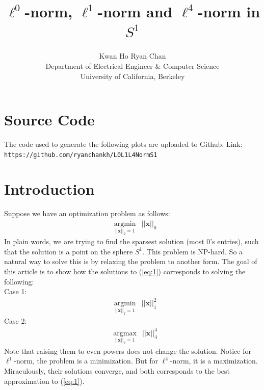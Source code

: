 \documentclass[11pt]{article}
\begin{document}
\title{$\ell^0$-norm, $\ell^1$-norm and $\ell^4$-norm in $S^1$}
\author{Kwan Ho Ryan Chan\\Department of Electrical Engineer \& Computer Science\\University of California, Berkeley}
\maketitle

\section{Source Code}
	The code used to generate the following plots are uploaded to Github. Link: \texttt{https://github.com/ryanchankh/L0L1L4NormS1}
\section{Introduction}
Suppose we have an optimization problem as follows:
\begin{equation}
\begin{aligned}
     & \underset{||\bm{x}||_2=1}{\text{argmin}} & ||\bm{x}||_0  \label{eq:1}
\end{aligned}
\end{equation}
In plain words, we are trying to find the sparsest solution (most 0's entries), such that the solution
is a point on the sphere $S^1$. This problem is NP-hard. So a natural way to solve this is by relaxing the problem to another form. The goal of this article is to show how the solutions to (\ref{eq:1}) corresponds to solving the following: \\
Case 1:
\begin{equation}
\begin{aligned}
     & \underset{||\bm{x}||_2=1}{\text{argmin}} & ||\bm{x}||_1^2  \label{eq:2}
\end{aligned}
\end{equation}
Case 2:  
\begin{equation}
\begin{aligned}
     & \underset{||\bm{x}||_2=1}{\text{argmax}} & ||\bm{x}||_4^4  \label{eq:3}
\end{aligned}
\end{equation}
Note that raising them to even powers does not change the solution. Notice for $\ell^1$-norm, the problem is a minimization. But for $\ell^4$-norm, it is a maximization. Miraculously, their solutions converge, and both corresponds to the best approximation to (\ref{eq:1}).  
\end{document}
